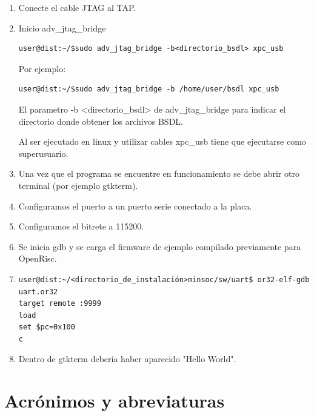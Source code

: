 \begin{enumerate}

\item Conecte el cable JTAG al TAP.
\item Inicio adv\_jtag\_bridge

\begin{lstlisting}[breaklines]
user@dist:~/$sudo adv_jtag_bridge -b<directorio_bsdl> xpc_usb 
\end{lstlisting}

Por ejemplo:

\begin{lstlisting}[breaklines]
user@dist:~/$sudo adv_jtag_bridge -b /home/user/bsdl xpc_usb 
\end{lstlisting}

El parametro -b <directorio\_bsdl> de adv\_jtag\_bridge para indicar el directorio donde obtener los archivos BSDL.

Al ser ejecutado en linux y utilizar cables xpc\_usb tiene que ejecutarse como superusuario.


\item Una vez que el programa se encuentre en funcionamiento se debe abrir otro terminal (por ejemplo gtkterm).
\item Configuramos el puerto a un puerto serie conectado a la placa.
\item Configuramos el bitrete a 115200.

\item Se inicia gdb y se carga el firmware de ejemplo compilado previamente para OpenRisc.

\item 
\begin{lstlisting}[breaklines]
user@dist:~/<directorio_de_instalación>minsoc/sw/uart$ or32-elf-gdb uart.or32
target remote :9999
load
set $pc=0x100
c
\end{lstlisting}

\item Dentro de gtkterm debería haber aparecido "Hello World". 

\end{enumerate}


\newpage

\section{Acrónimos y abreviaturas}

